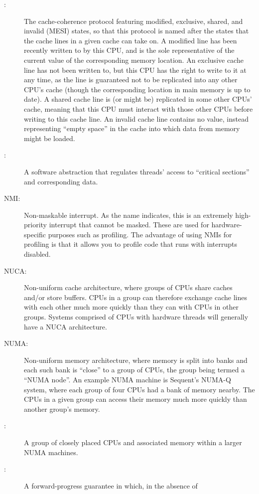 \begin{description}
\item[:]
	The
	cache-coherence protocol featuring
	modified, exclusive, shared, and invalid (MESI) states,
	so that this protocol is named after the states that the
	cache lines in a given cache can take on.
	A modified line has been recently written to by this CPU,
	and is the sole representative of the current value of
	the corresponding memory location.
	An exclusive cache line has not been written to, but this
	CPU has the right to write to it at any time, as the line
	is guaranteed not to be replicated into any other CPU's cache
	(though the corresponding location in main memory is up to date).
	A shared cache line is (or might be) replicated in some other
	CPUs' cache, meaning that this CPU must interact with those other
	CPUs before writing to this cache line.
	An invalid cache line contains no value, instead representing
	``empty space'' in the cache into which data from memory might
	be loaded.
\item[:]
	A software abstraction that regulates threads' access to
	``critical sections'' and corresponding data.
\item[NMI:]
	Non-maskable interrupt.
	As the name indicates, this is an extremely high-priority
	interrupt that cannot be masked.
	These are used for hardware-specific purposes such as profiling.
	The advantage of using NMIs for profiling is that it allows you
	to profile code that runs with interrupts disabled.
\item[NUCA:]
	Non-uniform cache architecture, where groups of CPUs share
	caches and/or store buffers.
	CPUs in a group can therefore exchange cache lines with each
	other much more quickly than they can with CPUs in other groups.
	Systems comprised of CPUs with hardware threads will generally
	have a NUCA architecture.
\item[NUMA:]
	Non-uniform memory architecture, where memory is split into
	banks and each such bank is ``close'' to a group of CPUs,
	the group being termed a ``NUMA node''.
	An example NUMA machine is Sequent's NUMA-Q system, where
	each group of four CPUs had a bank of memory nearby.
	The CPUs in a given group can access their memory much
	more quickly than another group's memory.
\item[:]
	A group of closely placed CPUs and associated memory within
	a larger NUMA machines.
\item[:]
	A forward-progress guarantee in which, in the absence of

\end{description}
